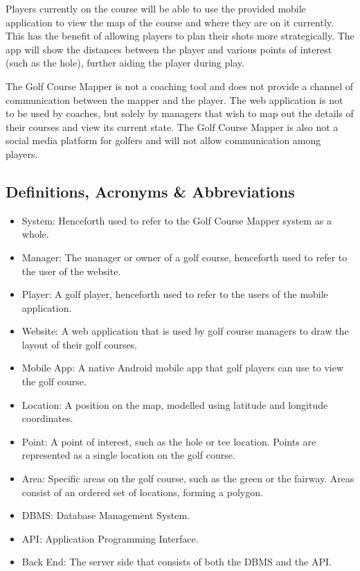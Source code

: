 \documentclass{article}
\begin{document}
    Players currently on the course will be able to use the provided mobile
    application to view the map of the course and where they are on it
    currently. This has the benefit of allowing players to plan their shots
    more strategically. The app will show the distances between the player and
    various points of interest (such as the hole), further aiding the player
    during play.

    The Golf Course Mapper is not a coaching tool and does not provide a
    channel of communication between the mapper and the player. The web
    application is not to be used by coaches, but solely by managers that wish
    to map out the details of their courses and view its current state. The
    Golf Course Mapper is also not a social media platform for golfers and will
    not allow communication among players.

    \subsection{Definitions, Acronyms \& Abbreviations}
    \begin{itemize}
        \item
            System: Henceforth used to refer to the Golf Course Mapper system
            as a whole.
        \item
            Manager: The manager or owner of a golf course, henceforth used to
            refer to the user of the website.
        \item
            Player: A golf player, henceforth used to refer to the users of the
            mobile application.
        \item
            Website: A web application that is used by golf course managers
            to draw the layout of their golf courses.
        \item
            Mobile App: A native Android mobile app that golf players can use to
            view the golf course.
        \item
            Location: A position on the map, modelled using latitude and longitude
            coordinates.
        \item
            Point: A point of interest, such as the hole or tee location.
            Points are represented as a single location on the golf course.
        \item
            Area: Specific areas on the golf course, such as the green or the
            fairway. Areas consist of an ordered set of locations, forming a
            polygon.
        \item
            DBMS: Database Management System.
        \item
            API: Application Programming Interface.
        \item
            Back End: The server side that consists of both the DBMS and the
            API.
    \end{itemize}
\end{document}
